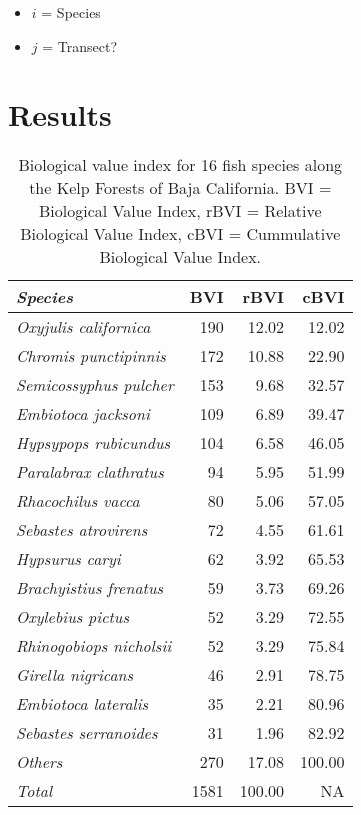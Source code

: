 \documentclass[12pt,]{article}
\begin{document}
\begin{itemize}
\item
  \(i\) = Species
\item
  \(j\) = Transect?
\end{itemize}

\clearpage

\section{Results}\label{results}

\begin{table}

\caption{\label{tab:unnamed-chunk-10}Biological value index for 16 fish species along the Kelp Forests of Baja California. BVI = Biological Value Index, rBVI = Relative Biological Value Index, cBVI = Cummulative Biological Value Index.}
\centering
\begin{tabular}[t]{>{\em}lrrr}
\toprule
Species & BVI & rBVI & cBVI\\
\midrule
Oxyjulis californica & 190 & 12.02 & 12.02\\
Chromis punctipinnis & 172 & 10.88 & 22.90\\
Semicossyphus pulcher & 153 & 9.68 & 32.57\\
Embiotoca jacksoni & 109 & 6.89 & 39.47\\
Hypsypops rubicundus & 104 & 6.58 & 46.05\\
\addlinespace
Paralabrax clathratus & 94 & 5.95 & 51.99\\
Rhacochilus vacca & 80 & 5.06 & 57.05\\
Sebastes atrovirens & 72 & 4.55 & 61.61\\
Hypsurus caryi & 62 & 3.92 & 65.53\\
Brachyistius frenatus & 59 & 3.73 & 69.26\\
\addlinespace
Oxylebius pictus & 52 & 3.29 & 72.55\\
Rhinogobiops nicholsii & 52 & 3.29 & 75.84\\
Girella nigricans & 46 & 2.91 & 78.75\\
Embiotoca lateralis & 35 & 2.21 & 80.96\\
Sebastes serranoides & 31 & 1.96 & 82.92\\
\addlinespace
Others & 270 & 17.08 & 100.00\\
Total & 1581 & 100.00 & NA\\
\bottomrule
\end{tabular}
\end{table}
\end{document}
